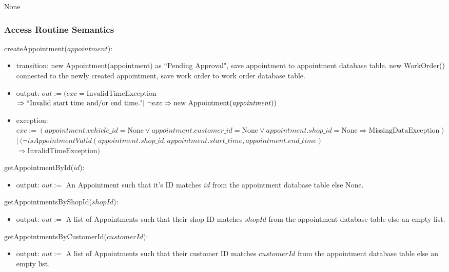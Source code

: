 \documentclass[12pt, titlepage]{article}
\begin{document}
None

\subsubsection{Access Routine Semantics}

\noindent createAppointment($appointment$):
\begin{itemize}
	\item transition: new Appointment(appointment) as ``Pending Approval", save appointment to appointment
	      database table. new WorkOrder() connected to the newly created appointment, save work order to work
	      order database table.
	\item output: $out := (exc = \text{InvalidTimeException}$ \\ $\Rightarrow \text{``Invalid start time
			      and/or end time."} |\ \neg exc \Rightarrow \text{new Appointment(\emph{appointment})})$
	\item exception: $exc := (appointment.vehicle\_id = \text{None} \lor appointment.customer\_id =
		      \text{None} \lor appointment.shop\_id = \text{None} \Rightarrow \text{MissingDataException})$ \\
	      $|\ (\neg isAppointmentValid(appointment.shop\_id, appointment.start\_time, appointment.end\_time)
	      $ \\ $\Rightarrow \text{InvalidTimeException})$
\end{itemize}

\noindent getAppointmentById($id$):
\begin{itemize}
	\item output: $out :=$ An Appointment such that it's ID matches $id$ from the appointment database table
	      else None.
\end{itemize}

\noindent getAppointmentsByShopId($shopId$):
\begin{itemize}
	\item output: $out :=$ A list of Appointments such that their shop ID matches $shopId$ from the
	      appointment database table else an empty list.
\end{itemize}

\noindent getAppointmentsByCustomerId($customerId$):
\begin{itemize}
	\item output: $out :=$ A list of Appointments such that their customer ID matches $customerId$ from the
	      appointment database table else an empty list.
\end{itemize}
\end{document}
